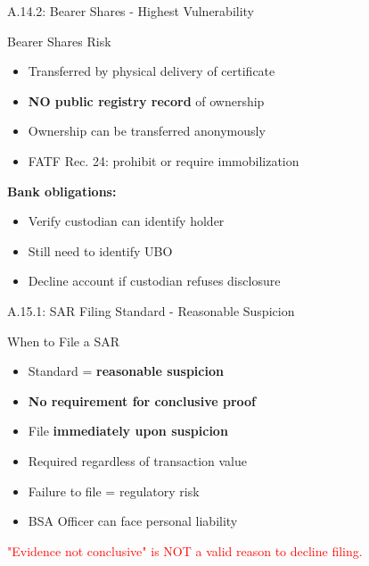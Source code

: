 \documentclass{beamer}
\begin{document}
	\begin{frame}{A.14.2: Bearer Shares - Highest Vulnerability}
		\begin{block}{Bearer Shares Risk}
			\begin{itemize}
				\item Transferred by physical delivery of certificate
				\item \textbf{NO public registry record} of ownership
				\item Ownership can be transferred anonymously
				\item FATF Rec. 24: prohibit or require immobilization
			\end{itemize}
		\end{block}
		\textbf{Bank obligations:}
		\begin{itemize}
			\item Verify custodian can identify holder
			\item Still need to identify UBO
			\item Decline account if custodian refuses disclosure
		\end{itemize}
	\end{frame}
	
	
	\begin{frame}{A.15.1: SAR Filing Standard - Reasonable Suspicion}
		\begin{block}{When to File a SAR}
			\begin{itemize}
				\item Standard = \textbf{reasonable suspicion}
				\item \textbf{No requirement for conclusive proof}
				\item File \textbf{immediately upon suspicion}
				\item Required regardless of transaction value
				\item Failure to file = regulatory risk
				\item BSA Officer can face personal liability
			\end{itemize}
		\end{block}
		\textcolor{red}{"Evidence not conclusive" is NOT a valid reason to decline filing.}
	\end{frame}
	
\end{document}
